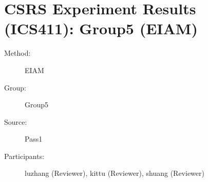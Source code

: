 \chapter {CSRS Experiment Results (ICS411): Group5 (EIAM)}
\small
	  

\begin{description}
\item [Method:] EIAM
\item [Group:] Group5
\item [Source:] Pass1
\item [Participants:] luzhang (Reviewer), kittu (Reviewer), shuang (Reviewer)
\end{description}
